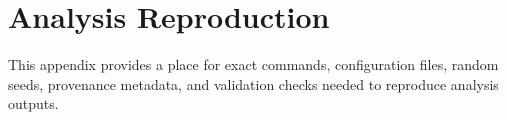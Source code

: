 \section{Analysis Reproduction}

This appendix provides a place for exact commands, configuration files, random
seeds, provenance metadata, and validation checks needed to reproduce analysis
outputs.
